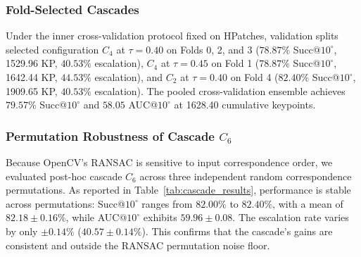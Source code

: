 \documentclass[conference]{IEEEtran}
\begin{document}
\subsubsection{Fold-Selected Cascades}
Under the inner cross-validation protocol fixed on HPatches, validation splits selected configuration $C_4$ at $\tau = 0.40$ on Folds 0, 2, and 3 ($78.87\%$ Succ@$10^\circ$, 1529.96 KP, $40.53\%$ escalation), $C_4$ at $\tau = 0.45$ on Fold 1 ($78.87\%$ Succ@$10^\circ$, 1642.44 KP, $44.53\%$ escalation), and $C_2$ at $\tau = 0.40$ on Fold 4 ($82.40\%$ Succ@$10^\circ$, 1909.65 KP, $40.53\%$ escalation). The pooled cross-validation ensemble achieves $79.57\%$ Succ@$10^\circ$ and $58.05$ AUC@$10^\circ$ at 1628.40 cumulative keypoints.

\subsubsection{Permutation Robustness of Cascade $C_6$}
Because OpenCV's RANSAC is sensitive to input correspondence order, we evaluated post-hoc cascade $C_6$ across three independent random correspondence permutations. As reported in Table~\ref{tab:cascade_results}, performance is stable across permutations: Succ@$10^\circ$ ranges from $82.00\%$ to $82.40\%$, with a mean of $82.18 \pm 0.16\%$, while AUC@$10^\circ$ exhibits $59.96 \pm 0.08$. The escalation rate varies by only $\pm 0.14\%$ ($40.57 \pm 0.14\%$). This confirms that the cascade's gains are consistent and outside the RANSAC permutation noise floor.
\end{document}
